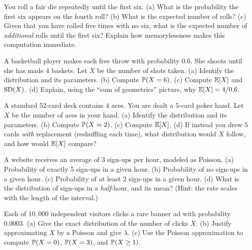 \begin{exercise}
\label{ch07:exr-geom}
You roll a fair die repeatedly until the first six.
(a) What is the probability the first six appears on the fourth roll?
(b) What is the expected number of rolls?
(c) Given that you have rolled five times with no six, what is the expected number
of \emph{additional} rolls until the first six? Explain how memorylessness makes
this computation immediate.
\end{exercise}

\begin{exercise}
\label{ch07:exr-negbinom}
A basketball player makes each free throw with probability $0.6$. She shoots until
she has made $4$ baskets. Let $X$ be the number of shots taken.
(a) Identify the distribution and its parameters.
(b) Compute $\P(X = 6)$.
(c) Compute $\E[X]$ and $\SD(X)$.
(d) Explain, using the ``sum of geometrics'' picture, why $\E[X] = 4/0.6$.
\end{exercise}

\begin{exercise}[Hypergeometric]
\label{ch07:exr-hypergeom}
A standard $52$-card deck contains $4$ aces. You are dealt a $5$-card poker hand.
Let $X$ be the number of aces in your hand.
(a) Identify the distribution and its parameters.
(b) Compute $\P(X = 2)$.
(c) Compute $\E[X]$.
(d) If instead you drew $5$ cards \emph{with} replacement (reshuffling each time),
what distribution would $X$ follow, and how would $\E[X]$ compare?
\end{exercise}

\begin{exercise}
\label{ch07:exr-pois}
A website receives an average of $3$ sign-ups per hour, modeled as Poisson.
(a) Probability of exactly $5$ sign-ups in a given hour.
(b) Probability of no sign-ups in a given hour.
(c) Probability of at least $2$ sign-ups in a given hour.
(d) What is the distribution of sign-ups in a \emph{half}-hour, and its mean?
(Hint: the rate scales with the length of the interval.)
\end{exercise}

\begin{exercise}
\label{ch07:exr-poisapprox}
Each of $10{,}000$ independent visitors clicks a rare banner ad with probability
$0.0003$.
(a) Give the exact distribution of the number of clicks $X$.
(b) Justify approximating $X$ by a Poisson and give $\lambda$.
(c) Use the Poisson approximation to compute $\P(X = 0)$, $\P(X = 3)$, and
$\P(X \ge 1)$.
\end{exercise}

